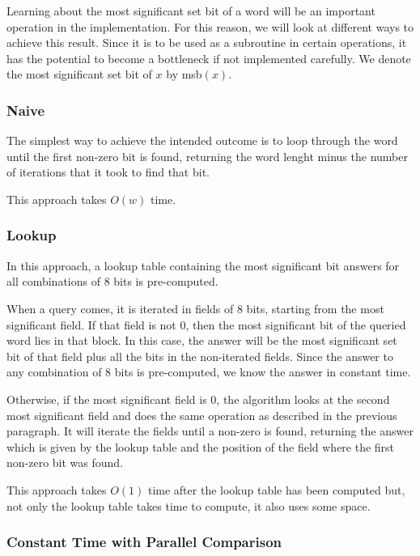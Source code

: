Learning about the most significant set bit of a word will be an important operation in the implementation. For this reason, we will look at different ways to achieve this result. Since it is to be used as a subroutine in certain operations, it has the potential to become a bottleneck if not implemented carefully. We denote the most significant set bit of $x$ by msb$(x)$.

\subsubsection{Naive}

The simplest way to achieve the intended outcome is to loop through the word until the first non-zero bit is found, returning the word lenght minus the number of iterations that it took to find that bit.

This approach takes $O(w)$ time.

\subsubsection{Lookup}

In this approach, a lookup table containing the most significant bit answers for all combinations of 8 bits is pre-computed.

When a query comes, it is iterated in fields of 8 bits, starting from the most significant field. If that field is not $0$, then the most significant bit of the queried word lies in that block.
In this case, the answer will be the most significant set bit of that field plus all the bits in the non-iterated fields. Since the answer to any combination of 8 bits is pre-computed, we know the answer in constant time.

Otherwise, if the most significant field is $0$, the algorithm looks at the second most significant field and does the same operation as described in the previous paragraph.
It will iterate the fields until a non-zero is found, returning the answer which is given by the lookup table and the position of the field where the first non-zero bit was found.

This approach takes $O(1)$ time after the lookup table has been computed but, not only the lookup table takes time to compute, it also uses some space.

\subsubsection{Constant Time with Parallel Comparison} \label{sec:msbO1}

